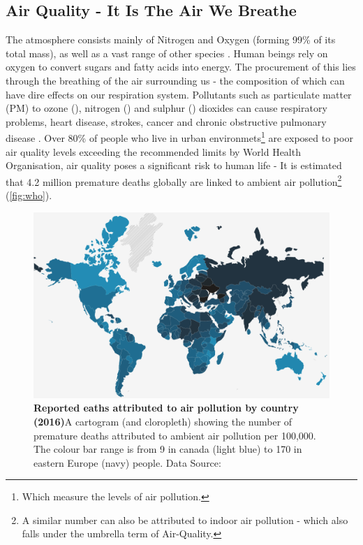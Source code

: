\subsection{Air Quality - It Is The Air We Breathe}\label{sec:airq}
The atmosphere consists mainly of Nitrogen and Oxygen (forming 99\% of its total mass), as well as a vast range of other species \citep{ac}. Human beings rely on oxygen to convert sugars and fatty acids into energy. The procurement of this lies through the breathing of the air surrounding us - the composition of which can have dire effects on our respiration system. Pollutants such as particulate matter (PM) to ozone (), nitrogen () and sulphur () dioxides can cause respiratory problems, heart disease, strokes, cancer and chronic obstructive pulmonary disease \cite{who}. Over 80\% of people who live in urban environmets\footnote{Which measure the levels of air pollution.} are exposed to poor air quality levels exceeding the recommended limits by World Health Organisation, air quality poses a significant risk to human life - It is estimated that 4.2 million premature deaths globally are linked to ambient air pollution\footnote{A similar number can also be attributed to indoor air pollution - which also falls under the umbrella term of Air-Quality.} (\autoref{fig:who}).


\begin{figure}[H]
  \centering
  \includegraphics[width=\textwidth]{who.png}
  \caption{\textbf{Reported eaths attributed to air pollution by country (2016)}A cartogram (and cloropleth) showing the number of premature deaths attributed to ambient air pollution per 100,000. The colour bar range is from 9 in canada (light blue) to 170 in eastern Europe (navy) people.  Data Source:\citep{whodata}}
  \label{fig:who}
\end{figure}

